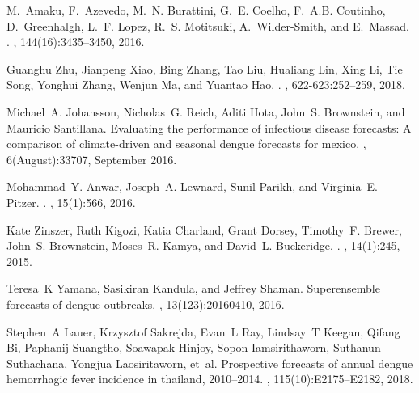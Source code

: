 \documentclass[a4paper]{article}
\begin{document}
\begin{thebibliography}{100}
M.~Amaku, F.~Azevedo, M.~N. Burattini, G.~E. Coelho, F.~A.B. Coutinho,
  D.~Greenhalgh, L.~F. Lopez, R.~S. Motitsuki, A.~Wilder-Smith, and E.~Massad.
.
, 144(16):3435--3450, 2016.

Guanghu Zhu, Jianpeng Xiao, Bing Zhang, Tao Liu, Hualiang Lin, Xing Li, Tie
  Song, Yonghui Zhang, Wenjun Ma, and Yuantao Hao.
.
, 622-623:252--259, 2018.

Michael~A. Johansson, Nicholas~G. Reich, Aditi Hota, John~S. Brownstein, and
  Mauricio Santillana.
\newblock Evaluating the performance of infectious disease forecasts: A
  comparison of climate-driven and seasonal dengue forecasts for mexico.
, 6(August):33707, September 2016.

Mohammad~Y. Anwar, Joseph~A. Lewnard, Sunil Parikh, and Virginia~E. Pitzer.
.
, 15(1):566, 2016.

Kate Zinszer, Ruth Kigozi, Katia Charland, Grant Dorsey, Timothy~F. Brewer,
  John~S. Brownstein, Moses~R. Kamya, and David~L. Buckeridge.
.
, 14(1):245, 2015.

Teresa~K Yamana, Sasikiran Kandula, and Jeffrey Shaman.
\newblock Superensemble forecasts of dengue outbreaks.
, 13(123):20160410, 2016.

Stephen~A Lauer, Krzysztof Sakrejda, Evan~L Ray, Lindsay~T Keegan, Qifang Bi,
  Paphanij Suangtho, Soawapak Hinjoy, Sopon Iamsirithaworn, Suthanun
  Suthachana, Yongjua Laosiritaworn, et~al.
\newblock Prospective forecasts of annual dengue hemorrhagic fever incidence in
  thailand, 2010--2014.
,
  115(10):E2175--E2182, 2018.


\end{thebibliography}
\end{document}
